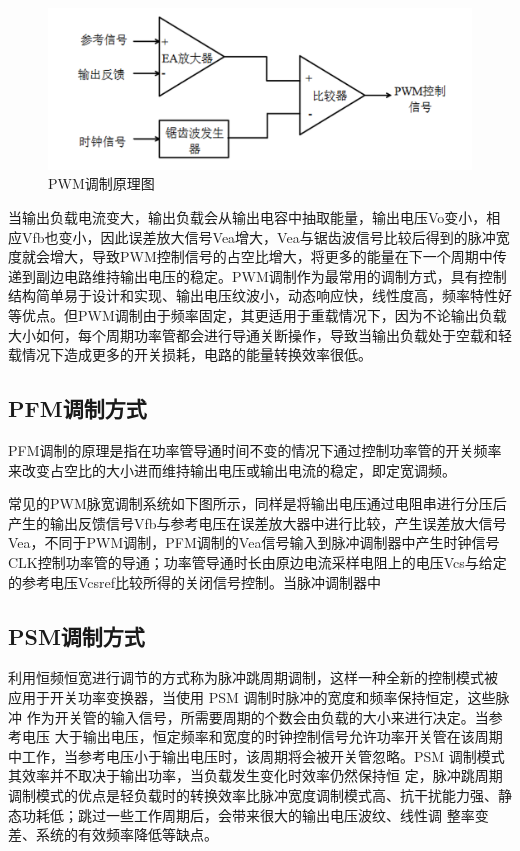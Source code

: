\begin{figure}[htbp] 
    \centering
    \includegraphics[width=0.8\linewidth]{figures/PWM调制1.png}
    \caption{PWM调制原理图}
    \label{fig:PWM调制1}
\end{figure}

当输出负载电流变大，输出负载会从输出电容中抽取能量，输出电压Vo变小，相应Vfb也变小，因此误差放大信号Vea增大，Vea与锯齿波信号比较后得到的脉冲宽度就会增大，导致PWM控制信号的占空比增大，将更多的能量在下一个周期中传递到副边电路维持输出电压的稳定。PWM调制作为最常用的调制方式，具有控制结构简单易于设计和实现、输出电压纹波小，动态响应快，线性度高，频率特性好等优点。但PWM调制由于频率固定，其更适用于重载情况下，因为不论输出负载大小如何，每个周期功率管都会进行导通关断操作，导致当输出负载处于空载和轻载情况下造成更多的开关损耗，电路的能量转换效率很低。

\subsection{PFM调制方式}
PFM调制的原理是指在功率管导通时间不变的情况下通过控制功率管的开关频率来改变占空比的大小进而维持输出电压或输出电流的稳定，即定宽调频。

常见的PWM脉宽调制系统如下图所示，同样是将输出电压通过电阻串进行分压后产生的输出反馈信号Vfb与参考电压在误差放大器中进行比较，产生误差放大信号Vea，不同于PWM调制，PFM调制的Vea信号输入到脉冲调制器中产生时钟信号CLK控制功率管的导通；功率管导通时长由原边电流采样电阻上的电压Vcs与给定的参考电压Vcsref比较所得的关闭信号控制。当脉冲调制器中
\subsection{PSM调制方式}
利用恒频恒宽进行调节的方式称为脉冲跳周期调制，这样一种全新的控制模式被 应用于开关功率变换器，当使用 PSM 调制时脉冲的宽度和频率保持恒定，这些脉冲 作为开关管的输入信号，所需要周期的个数会由负载的大小来进行决定。当参考电压 大于输出电压，恒定频率和宽度的时钟控制信号允许功率开关管在该周期中工作，当参考电压小于输出电压时，该周期将会被开关管忽略。PSM 调制模式其效率并不取决于输出功率，当负载发生变化时效率仍然保持恒 定，脉冲跳周期调制模式的优点是轻负载时的转换效率比脉冲宽度调制模式高、抗干扰能力强、静态功耗低；跳过一些工作周期后，会带来很大的输出电压波纹、线性调 整率变差、系统的有效频率降低等缺点。
